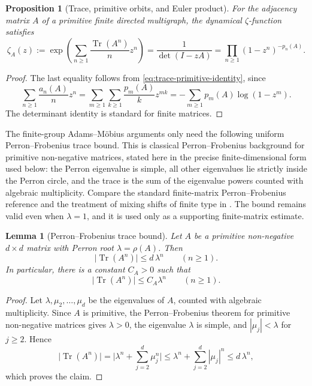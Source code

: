 \documentclass[11pt,a4paper]{amsart}
\theoremstyle{plain}
\newtheorem{proposition}[theorem]{Proposition}
\newtheorem{lemma}[theorem]{Lemma}
\theoremstyle{definition}
\theoremstyle{remark}
\DeclareMathOperator{\Tr}{Tr}
\newcommand{\abs}[1]{\lvert #1 \rvert}
\begin{document}
\begin{proposition}[Trace, primitive orbits, and Euler product]
  \label{prop:prelim-trace-primitive}
  For the adjacency matrix \(A\) of a primitive finite directed
  multigraph, the dynamical \(\zeta\)-function
  satisfies
  \begin{equation}\label{eq:zeta-def}
    \zeta_A(z)
    :=\exp\!\left(\sum_{n\ge 1}\frac{\Tr(A^n)}{n}z^n\right)
    =\frac{1}{\det(I-zA)}
    =\prod_{n\ge 1}(1-z^n)^{-p_n(A)}.
  \end{equation}
\end{proposition}

\begin{proof}
  The last equality follows from \eqref{eq:trace-primitive-identity},
  since
  \[
    \sum_{n\ge 1}\frac{a_n(A)}{n}z^n
    =\sum_{m\ge 1}\sum_{k\ge 1}\frac{p_m(A)}{k}z^{mk}
    =-\sum_{m\ge 1}p_m(A)\log(1-z^m).
  \]
  The determinant identity is standard for finite matrices.
\end{proof}

The finite-group Adams--M\"obius arguments only need the following
uniform Perron--Frobenius trace bound.  This is classical
Perron--Frobenius background for primitive non-negative matrices, stated
here in the precise finite-dimensional form used below: the Perron
eigenvalue is simple, all other eigenvalues lie strictly inside the Perron
circle, and the trace is the sum of the eigenvalue powers counted with
algebraic multiplicity.  Compare the standard finite-matrix
Perron--Frobenius reference \cite{Seneta2006NonnegativeMatrices} and the
treatment of mixing shifts of finite type in
\cite{LindMarcus1995,ParryPollicott1990Zeta}.
The bound remains valid even when \(\lambda=1\), and it is used only as a
supporting finite-matrix estimate.

\begin{lemma}[Perron--Frobenius trace bound]
  \label{lem:pf-trace-bound}
  Let \(A\) be a primitive non-negative \(d\times d\) matrix with
  Perron root \(\lambda=\rho(A)\). Then
  \[
    \abs{\Tr(A^n)}\le d\,\lambda^n
    \qquad (n\ge 1).
  \]
  In particular, there is a constant \(C_A>0\) such that
  \[
    \abs{\Tr(A^n)}\le C_A\lambda^n
    \qquad (n\ge 1).
  \]
\end{lemma}

\begin{proof}
  Let \(\lambda,\mu_2,\dots,\mu_d\) be the eigenvalues of \(A\), counted
  with algebraic multiplicity. Since \(A\) is primitive,
  the Perron--Frobenius theorem for primitive non-negative matrices
  \cite{Seneta2006NonnegativeMatrices} gives \(\lambda>0\), the eigenvalue
  \(\lambda\) is simple, and \(|\mu_j|<\lambda\) for \(j\ge 2\). Hence
  \[
    \abs{\Tr(A^n)}
    =
    \abs{\lambda^n+\sum_{j=2}^d\mu_j^n}
    \le
    \lambda^n+\sum_{j=2}^d|\mu_j|^n
    \le
    d\,\lambda^n,
  \]
  which proves the claim.
\end{proof}
\end{document}
